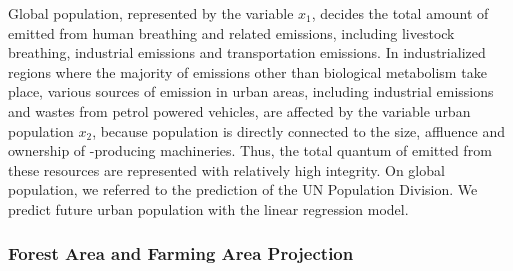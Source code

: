 \documentclass[12pt]{article}
\begin{document}
Global population, represented by the variable $x_1$, decides the total amount of  emitted from human breathing and related emissions, including livestock breathing, industrial emissions and transportation emissions. In industrialized regions where the majority of  emissions other than biological metabolism take place, various sources of  emission in urban areas, including industrial emissions and wastes from petrol powered vehicles, are affected by the variable urban population $x_2$, because population is directly connected to the size, affluence and ownership of -producing machineries. Thus, the total quantum of  emitted from these resources are represented with relatively high integrity. On global population, we referred to the prediction of the UN Population Division. We predict future urban population with the linear regression model.  

\subsubsection*{Forest Area and Farming Area Projection}
\end{document}
